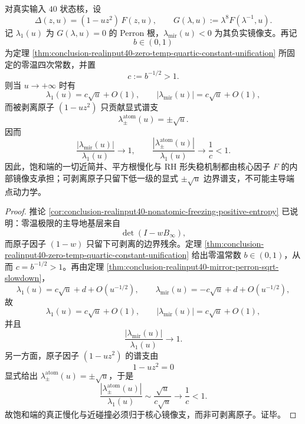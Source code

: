 \begin{theorem}[原子剥离后的核心镜像支主导律]\label{thm:conclusion-core-mirror-branch-saturation-dominance}
对真实输入 \(40\) 状态核，设
\[
\Delta(z,u)=(1-u z^2)\,F(z,u),
\qquad
G(\lambda,u):=\lambda^8F(\lambda^{-1},u).
\]
记 \(\lambda_1(u)\) 为 \(G(\lambda,u)=0\) 的 Perron 根，\(\lambda_{\mathrm{mir}}(u)<0\) 为其负实镜像支。再记
\[
b\in(0,1)
\]
为定理 \ref{thm:conclusion-realinput40-zero-temp-quartic-constant-unification} 所固定的零温四次常数，并置
\[
c:=b^{-1/2}>1.
\]
则当 \(u\to+\infty\) 时有
\[
\lambda_1(u)=c\sqrt{u}+O(1),
\qquad
|\lambda_{\mathrm{mir}}(u)|=c\sqrt{u}+O(1),
\]
而被剥离原子 \((1-u z^2)\) 只贡献显式谱支
\[
\lambda_{\pm}^{\mathrm{atom}}(u)=\pm\sqrt{u}.
\]
因而
\[
\frac{|\lambda_{\mathrm{mir}}(u)|}{\lambda_1(u)}\longrightarrow 1,
\qquad
\frac{|\lambda_{\pm}^{\mathrm{atom}}(u)|}{\lambda_1(u)}\longrightarrow \frac1c<1.
\]
因此，饱和端的一切近简并、平方根慢化与 RH 形失稳机制都由核心因子 \(F\) 的内部镜像支承担；可剥离原子只留下低一级的显式 \(\pm\sqrt u\) 边界谱支，不可能主导端点动力学。
\end{theorem}
\begin{proof}
推论 \ref{cor:conclusion-realinput40-nonatomic-freezing-positive-entropy} 已说明：零温极限的主导地基层来自
\[
\det(I-wB_\infty),
\]
而原子因子 \((1-w)\) 只留下可剥离的边界残余。定理 \ref{thm:conclusion-realinput40-zero-temp-quartic-constant-unification} 给出零温常数 \(b\in(0,1)\)，从而 \(c=b^{-1/2}>1\)。再由定理 \ref{thm:conclusion-realinput40-mirror-perron-sqrt-slowdown}，
\[
\lambda_1(u)=c\sqrt u+d+O(u^{-1/2}),
\qquad
\lambda_{\mathrm{mir}}(u)=-c\sqrt u+d+O(u^{-1/2}),
\]
故
\[
\lambda_1(u)=c\sqrt u+O(1),
\qquad
|\lambda_{\mathrm{mir}}(u)|=c\sqrt u+O(1),
\]
并且
\[
\frac{|\lambda_{\mathrm{mir}}(u)|}{\lambda_1(u)}\to 1.
\]
另一方面，原子因子 \((1-u z^2)\) 的谱支由
\[
1-u z^2=0
\]
显式给出 \(\lambda_\pm^{\mathrm{atom}}(u)=\pm\sqrt u\)，于是
\[
\frac{|\lambda_\pm^{\mathrm{atom}}(u)|}{\lambda_1(u)}
\sim
\frac{\sqrt u}{c\sqrt u}
\to
\frac1c<1.
\]
故饱和端的真正慢化与近碰撞必须归于核心镜像支，而非可剥离原子。证毕。
\end{proof}

